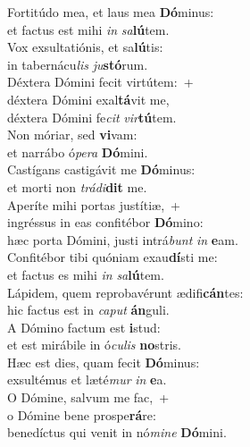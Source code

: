 \evenverse Fortitúdo mea, et laus mea \textbf{Dó}minus:~\*\\
\evenverse et factus est mihi \textit{in} \textit{sa}\textbf{lú}tem.\\
\oddverse Vox exsultatiónis, et sa\textbf{lú}tis:~\*\\
\oddverse in tabernácu\textit{lis} \textit{ju}\textbf{stó}rum.\\
\evenverse Déxtera Dómini fecit virtútem:~+\\
\evenverse  déxtera Dómini exal\textbf{tá}vit me,~\*\\
\evenverse déxtera Dómini fe\textit{cit} \textit{vir}\textbf{tú}tem.\\
\oddverse Non móriar, sed \textbf{vi}vam:~\*\\
\oddverse et narrábo ó\textit{pe}\textit{ra} \textbf{Dó}mini.\\
\evenverse Castígans castigávit me \textbf{Dó}minus:~\*\\
\evenverse et morti non \textit{trá}\textit{di}\textbf{dit} me.\\
\oddverse Aperíte mihi portas justítiæ,~+\\
\oddverse  ingréssus in eas confitébor \textbf{Dó}mino:~\*\\
\oddverse hæc porta Dómini, justi intrá\textit{bunt} \textit{in} \textbf{e}am.\\
\evenverse Confitébor tibi quóniam exau\textbf{dí}sti me:~\*\\
\evenverse et factus es mihi \textit{in} \textit{sa}\textbf{lú}tem.\\
\oddverse Lápidem, quem reprobavérunt ædifi\textbf{cán}tes:~\*\\
\oddverse hic factus est in \textit{ca}\textit{put} \textbf{án}guli.\\
\evenverse A Dómino factum est \textbf{i}stud:~\*\\
\evenverse et est mirábile in ó\textit{cu}\textit{lis} \textbf{no}stris.\\
\oddverse Hæc est dies, quam fecit \textbf{Dó}minus:~\*\\
\oddverse exsultémus et læté\textit{mur} \textit{in} \textbf{e}a.\\
\evenverse O Dómine, salvum me fac,~+\\
\evenverse  o Dómine bene prospe\textbf{rá}re:~\*\\
\evenverse benedíctus qui venit in nó\textit{mi}\textit{ne} \textbf{Dó}mini.\\
